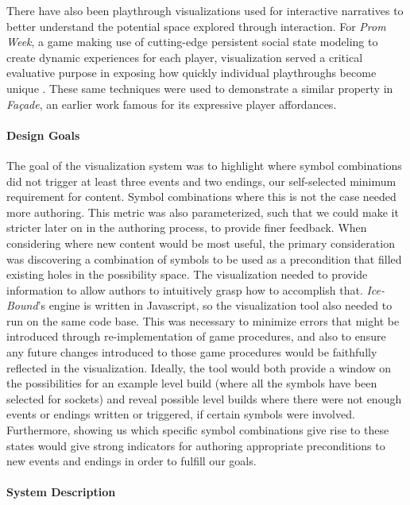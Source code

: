 There have also been playthrough visualizations used for interactive narratives to better understand the potential space explored through interaction. For \textit{Prom Week}, a game making use of cutting-edge persistent social state modeling to create dynamic experiences for each player, visualization served a critical evaluative purpose in exposing how quickly individual playthroughs become unique \cite{promweek_playtraces}. These same techniques were used to demonstrate a similar property in \textit{Façade}, an earlier work famous for its expressive player affordances.

\paragraph{Design Goals}\label{par:icebound-design-goals}

The goal of the visualization system was to highlight where symbol combinations did not trigger at least three events and two endings, our self-selected minimum requirement for content. Symbol combinations where this is not the case needed more authoring. This metric was also parameterized, such that we could make it stricter later on in the authoring process, to provide finer feedback. When considering where new content would be most useful, the primary consideration was discovering a combination of symbols to be used as a precondition that filled existing holes in the possibility space. The visualization needed to provide information to allow authors to intuitively grasp how to accomplish that. \textit{Ice-Bound}’s engine is written in Javascript, so the visualization tool also needed to run on the same code base. This was necessary to minimize errors that might be introduced through re-implementation of game procedures, and also to ensure any future changes introduced to those game procedures would be faithfully reflected in the visualization. Ideally, the tool would both provide a window on the possibilities for an example level build (where all the symbols have been selected for sockets) and reveal possible level builds where there were not enough events or endings written or triggered, if certain symbols were involved. Furthermore, showing us which specific symbol combinations give rise to these states would give strong indicators for authoring appropriate preconditions to new events and endings in order to fulfill our goals.

\paragraph{System Description}\label{par:icebound-system-description}

